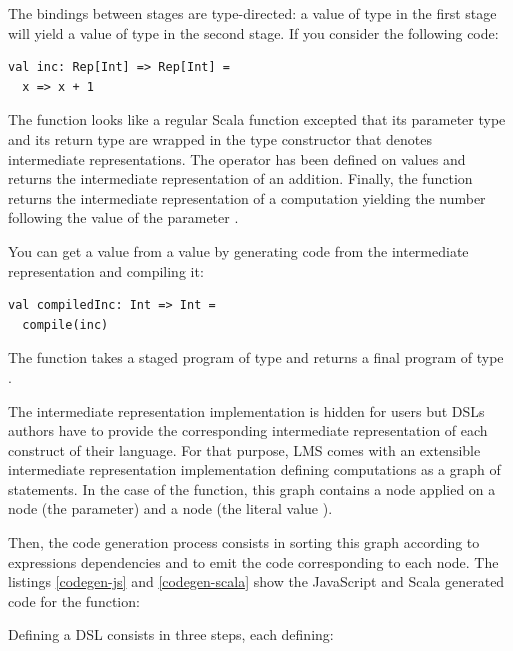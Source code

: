 \documentclass[runningheads,a4paper]{llncs}
\begin{document}
The bindings between stages are type-directed: a value of type  in the first stage will yield a value
of type  in the second stage. If you consider the following code:
\begin{lstlisting}
val inc: Rep[Int] => Rep[Int] =
  x => x + 1
\end{lstlisting}
The function looks like
a regular Scala function excepted that its parameter type and its return type are wrapped in the  type
constructor that denotes intermediate representations. The \code{+} operator has been defined on 
values and returns the intermediate representation of an addition. Finally, the  function returns the
intermediate representation of a computation yielding the number following the value of the parameter .

You can get a  value from a  value by generating code from the intermediate representation and
compiling it:
\begin{lstlisting}
val compiledInc: Int => Int =
  compile(inc)
\end{lstlisting}
The  function takes a staged program of type  and returns a final program of
type .

The intermediate representation implementation is hidden for users but DSLs authors have to provide the corresponding
intermediate representation of each construct of their language. For that purpose, LMS comes with an extensible
intermediate representation implementation defining computations as a graph of statements. In the case of the
 function, this graph contains a  node applied on a  node (the  parameter) and
a  node (the literal value ).

Then, the code generation process consists in sorting this graph according to expressions dependencies and to emit
the code corresponding to each node. The listings \ref{codegen-js} and \ref{codegen-scala} show the JavaScript and
Scala generated code for the  function:
\begin{multicols}{2}


\end{multicols}

Defining a DSL consists in three steps, each defining:
\end{document}
